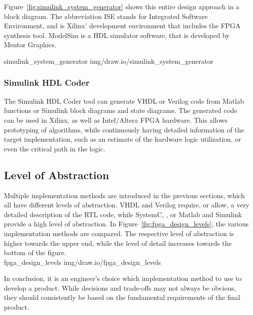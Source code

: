 Figure~\ref{fig:simulink_system_generator} shows this entire design approach in a block diagram.
The abbreviation ISE stands for Integrated Software Environment, and is Xilinx' development environment that includes the FPGA synthesis tool.
ModelSim is a HDL simulator software, that is developed by Mentor Graphics.

 {simulink_system_generator} {img/draw.io/simulink_system_generator}

\subsubsection{Simulink HDL Coder}

The Simulink HDL Coder tool can generate VHDL or Verilog code from Matlab functions or Simulink block diagrams and state diagrams.
The generated code can be used in Xilinx, as well as Intel/Altera FPGA hardware.
This allows prototyping of algorithms, while continuously having detailed information of the target implementation, such as an estimate of the hardware logic utilization, or even the critical path in the logic.

\subsection{Level of Abstraction}

Multiple implementation methods are introduced in the previous sections, which all have different levels of abstraction.
VHDL and Verilog require, or allow, a very detailed description of the RTL code, while SystemC, \cplusplus, or Matlab and Simulink provide a high level of abstraction.
In Figure~\ref{fig:fpga_design_levels}, the various implementation methods are compared.
The respective level of abstraction is higher towards the upper end, while the level of detail increases towards the bottom of the figure.\\

 {fpga_design_levels} {img/draw.io/fpga_design_levels}

In conclusion, it is an engineer's choice which implementation method to use to develop a product.
While decisions and trade-offs may not always be obvious, they should consistently be based on the fundamental requirements of the final product.
